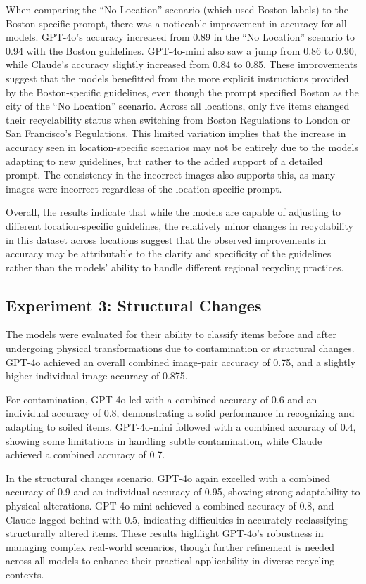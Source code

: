\documentclass{article}
\begin{document}
When comparing the “No Location” scenario (which used Boston labels) to the Boston-specific prompt, there was a noticeable improvement in accuracy for all models. GPT-4o’s accuracy increased from 0.89 in the “No Location” scenario to 0.94 with the Boston guidelines. GPT-4o-mini also saw a jump from 0.86 to 0.90, while Claude’s accuracy slightly increased from 0.84 to 0.85. These improvements suggest that the models benefitted from the more explicit instructions provided by the Boston-specific guidelines, even though the prompt specified Boston as the city of the “No Location” scenario.
Across all locations, only five items changed their recyclability status when switching from Boston Regulations to London or San Francisco’s Regulations. This limited variation implies that the increase in accuracy seen in location-specific scenarios may not be entirely due to the models adapting to new guidelines, but rather to the added support of a detailed prompt. The consistency in the incorrect images also supports this, as many images were incorrect regardless of the location-specific prompt.

Overall, the results indicate that while the models are capable of adjusting to different location-specific guidelines, the relatively minor changes in recyclability in this dataset across locations suggest that the observed improvements in accuracy may be attributable to the clarity and specificity of the guidelines rather than the models’ ability to handle different regional recycling practices.


\subsection{Experiment 3: Structural Changes}
The models were evaluated for their ability to classify items before and after undergoing physical transformations due to contamination or structural changes. GPT-4o achieved an overall combined image-pair accuracy of 0.75, and a slightly higher individual image accuracy of 0.875. 

For contamination, GPT-4o led with a combined accuracy of 0.6 and an individual accuracy of 0.8, demonstrating a solid performance in recognizing and adapting to soiled items. GPT-4o-mini followed with a combined accuracy of 0.4, showing some limitations in handling subtle contamination, while Claude achieved a combined accuracy of 0.7.

In the structural changes scenario, GPT-4o again excelled with a combined accuracy of 0.9 and an individual accuracy of 0.95, showing strong adaptability to physical alterations. GPT-4o-mini achieved a combined accuracy of 0.8, and Claude lagged behind with 0.5, indicating difficulties in accurately reclassifying structurally altered items. These results highlight GPT-4o’s robustness in managing complex real-world scenarios, though further refinement is needed across all models to enhance their practical applicability in diverse recycling contexts.
\end{document}
